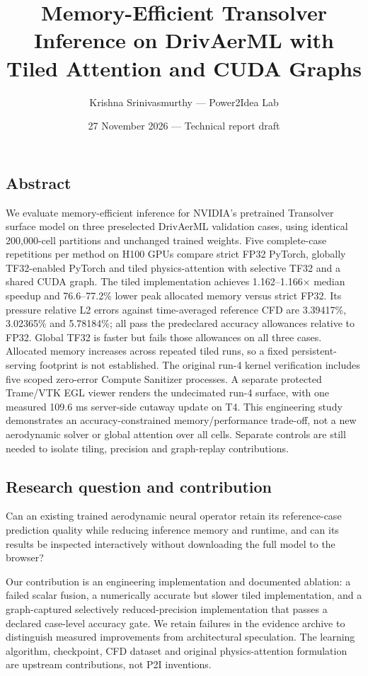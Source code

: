 \documentclass[
  10pt,
]{article}
\title{Memory-Efficient Transolver Inference on DrivAerML with Tiled
Attention and CUDA Graphs}
\author{Krishna Srinivasmurthy --- Power2Idea Lab}
\date{27 November 2026 --- Technical report draft}
\begin{document}
\maketitle

\subsection{Abstract}\label{abstract}

We evaluate memory-efficient inference for NVIDIA's pretrained
Transolver surface model on three preselected DrivAerML validation
cases, using identical 200,000-cell partitions and unchanged trained
weights. Five complete-case repetitions per method on H100 GPUs compare
strict FP32 PyTorch, globally TF32-enabled PyTorch and tiled
physics-attention with selective TF32 and a shared CUDA graph. The tiled
implementation achieves 1.162--1.166× median speedup and 76.6--77.2\%
lower peak allocated memory versus strict FP32. Its pressure relative L2
errors against time-averaged reference CFD are 3.39417\%, 3.02365\% and
5.78184\%; all pass the predeclared accuracy allowances relative to
FP32. Global TF32 is faster but fails those allowances on all three
cases. Allocated memory increases across repeated tiled runs, so a fixed
persistent-serving footprint is not established. The original run-4
kernel verification includes five scoped zero-error Compute Sanitizer
processes. A separate protected Trame/VTK EGL viewer renders the
undecimated run-4 surface, with one measured 109.6 ms server-side
cutaway update on T4. This engineering study demonstrates an
accuracy-constrained memory/performance trade-off, not a new aerodynamic
solver or global attention over all cells. Separate controls are still
needed to isolate tiling, precision and graph-replay contributions.

\subsection{Research question and
contribution}\label{research-question-and-contribution}

Can an existing trained aerodynamic neural operator retain its
reference-case prediction quality while reducing inference memory and
runtime, and can its results be inspected interactively without
downloading the full model to the browser?

Our contribution is an engineering implementation and documented
ablation: a failed scalar fusion, a numerically accurate but slower
tiled implementation, and a graph-captured selectively reduced-precision
implementation that passes a declared case-level accuracy gate. We
retain failures in the evidence archive to distinguish measured
improvements from architectural speculation. The learning algorithm,
checkpoint, CFD dataset and original physics-attention formulation are
upstream contributions, not P2I inventions.
\end{document}
